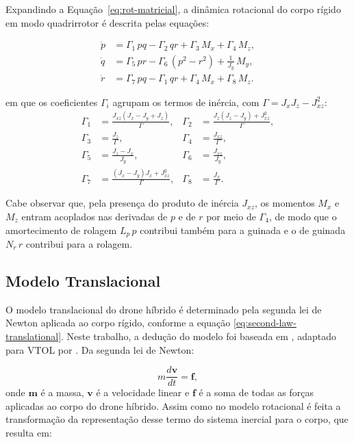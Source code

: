 Expandindo a Equação~\eqref{eq:rot-matricial}, a dinâmica rotacional do corpo rígido em modo quadrirrotor é descrita pelas equações:

{\color{blue}
\begin{align}
  \dot{p} &= \Gamma_1\,pq - \Gamma_2\,qr + \Gamma_3\,M_x + \Gamma_4\,M_z, \label{eq:p_dot} \\
  \dot{q} &= \Gamma_5\,pr - \Gamma_6\,(p^2 - r^2) + \frac{1}{J_y}\,M_y, \label{eq:q_dot} \\
  \dot{r} &= \Gamma_7\,pq - \Gamma_1\,qr + \Gamma_4\,M_x + \Gamma_8\,M_z. \label{eq:r_dot}
\end{align}
}

em que os coeficientes $\Gamma_i$ agrupam os termos de inércia, com $\Gamma = J_x J_z - J_{xz}^2$:
\begin{equation}
\begin{aligned}
    \Gamma_1 &= \frac{J_{xz}(J_x - J_y + J_z)}{\Gamma}, &
    \Gamma_2 &= \frac{J_z(J_z - J_y) + J_{xz}^2}{\Gamma}, \\
    \Gamma_3 &= \frac{J_z}{\Gamma}, &
    \Gamma_4 &= \frac{J_{xz}}{\Gamma}, \\
    \Gamma_5 &= \frac{J_z - J_x}{J_y}, &
    \Gamma_6 &= \frac{J_{xz}}{J_y}, \\
    \Gamma_7 &= \frac{(J_x - J_y)J_x + J_{xz}^2}{\Gamma}, &
    \Gamma_8 &= \frac{J_x}{\Gamma}.
\end{aligned}
\label{eq:gammas}
\end{equation}

{\color{blue}Cabe observar que, pela presença do produto de inércia $J_{xz}$, os momentos $M_x$ e $M_z$ entram acoplados nas derivadas de $p$ e de $r$ por meio de $\Gamma_4$, de modo que o amortecimento de rolagem $L_p\,p$ contribui também para a guinada e o de guinada $N_r\,r$ contribui para a rolagem.}

\subsection{Modelo Translacional}

O modelo translacional do drone híbrido é determinado pela segunda lei de Newton aplicada ao corpo rígido, conforme a equação \eqref{eq:second-law-translational}. Neste trabalho, a dedução do modelo foi baseada em \textcite{Beard2012}, adaptado para VTOL por \textcite{Graesdal2021}. Da segunda lei de Newton:

\begin{equation}
  m\frac{d \mathbf{v}}{dt} = \mathbf{f},
  \label{eq:second-law-translational}
\end{equation}
onde $\mathbf{m}$ é a massa, $\mathbf{v}$ é a velocidade linear e $\mathbf{f}$ é a soma de todas as forças aplicadas ao corpo do drone híbrido. Assim como no modelo rotacional é feita a transformação da representação desse termo do sistema inercial para o corpo, que resulta em:

